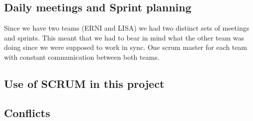 \subsection{Daily meetings and Sprint planning}

Since we have two teams (ERNI and LISA) we had two distinct sets of meetings and sprints. This meant that we had to bear in mind what the other team was doing since we were supposed to work in sync. One scrum master for each team with constant communication between both teams. 

\subsection{Use of SCRUM in this project}

\subsection{Conflicts}
